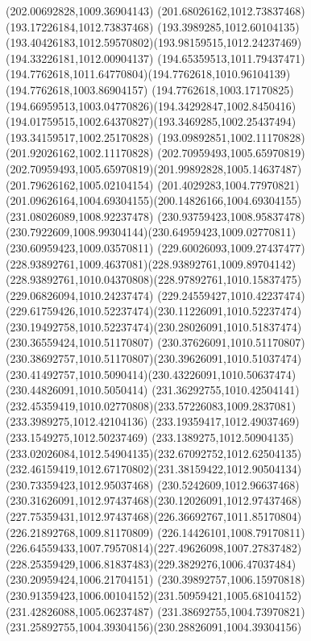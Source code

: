 {{		\lineto(202.00692828,1009.36904143)
		\lineto(201.68026162,1012.73837468)
		\lineto(193.17226184,1012.73837468)
		\lineto(193.3989285,1012.60104135)
		\curveto(193.40426183,1012.59570802)(193.98159515,1012.24237469)(194.33226181,1012.00904137)
		\curveto(194.65359513,1011.79437471)(194.7762618,1011.64770804)(194.7762618,1010.96104139)
		\lineto(194.7762618,1003.86904157)
		\curveto(194.7762618,1003.17170825)(194.66959513,1003.04770826)(194.34292847,1002.8450416)
		\curveto(194.01759515,1002.64370827)(193.3469285,1002.25437494)(193.34159517,1002.25170828)
		\lineto(193.09892851,1002.11170828)
		\lineto(201.92026162,1002.11170828)
		\lineto(202.70959493,1005.65970819)
		\curveto(202.70959493,1005.65970819)(201.99892828,1005.14637487)(201.79626162,1005.02104154)
		\curveto(201.4029283,1004.77970821)(201.09626164,1004.69304155)(200.14826166,1004.69304155)
		\moveto(231.08026089,1008.92237478)
		\curveto(230.93759423,1008.95837478)(230.7922609,1008.99304144)(230.64959423,1009.02770811)
		\lineto(230.60959423,1009.03570811)
		\curveto(229.60026093,1009.27437477)(228.93892761,1009.4637081)(228.93892761,1009.89704142)
		\curveto(228.93892761,1010.04370808)(228.97892761,1010.15837475)(229.06826094,1010.24237474)
		\curveto(229.24559427,1010.42237474)(229.61759426,1010.52237474)(230.11226091,1010.52237474)
		\curveto(230.19492758,1010.52237474)(230.28026091,1010.51837474)(230.36559424,1010.51170807)
		\curveto(230.37626091,1010.51170807)(230.38692757,1010.51170807)(230.39626091,1010.51037474)
		\curveto(230.41492757,1010.5090414)(230.43226091,1010.50637474)(230.44826091,1010.5050414)
		\curveto(231.36292755,1010.42504141)(232.45359419,1010.02770808)(233.57226083,1009.2837081)
		\lineto(233.3989275,1012.42104136)
		\lineto(233.19359417,1012.49037469)
		\lineto(233.1549275,1012.50237469)
		\curveto(233.1389275,1012.50904135)(233.02026084,1012.54904135)(232.67092752,1012.62504135)
		\curveto(232.46159419,1012.67170802)(231.38159422,1012.90504134)(230.73359423,1012.95037468)
		\curveto(230.5242609,1012.96637468)(230.31626091,1012.97437468)(230.12026091,1012.97437468)
		\curveto(227.75359431,1012.97437468)(226.36692767,1011.85170804)(226.21892768,1009.81170809)
		\curveto(226.14426101,1008.79170811)(226.64559433,1007.79570814)(227.49626098,1007.27837482)
		\curveto(228.25359429,1006.81837483)(229.3829276,1006.47037484)(230.20959424,1006.21704151)
		\lineto(230.39892757,1006.15970818)
		\curveto(230.91359423,1006.00104152)(231.50959421,1005.68104152)(231.42826088,1005.06237487)
		\curveto(231.38692755,1004.73970821)(231.25892755,1004.39304156)(230.28826091,1004.39304156)
}}
